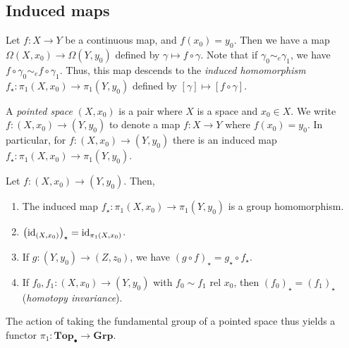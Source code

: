 \subsection{Induced maps}
\begin{definition}
	Let \( f \colon X \to Y \) be a continuous map, and \( f(x_0) = y_0 \).
	Then we have a map \( \Omega(X,x_0) \to \Omega(Y,y_0) \) defined by \( \gamma \mapsto f \circ \gamma \).
	Note that if \( \gamma_0 \sim_e \gamma_1 \), we have \( f \circ \gamma_0 \sim_e f \circ \gamma_1 \).
	Thus, this map descends to the \emph{induced homomorphism} \( f_\star \colon \pi_1(X, x_0) \to \pi_1(Y,y_0) \) defined by \( [\gamma] \mapsto [f \circ \gamma] \).
\end{definition}
\begin{definition}
	A \emph{pointed space} \( (X, x_0) \) is a pair where \( X \) is a space and \( x_0 \in X \).
	We write \( f \colon (X, x_0) \to (Y, y_0) \) to denote a map \( f \colon X \to Y \) where \( f(x_0) = y_0 \).
	In particular, for \( f \colon (X,x_0) \to (Y,y_0) \) there is an induced map \( f_\star \colon \pi_1(X,x_0) \to \pi_1(Y,y_0) \).
\end{definition}
\begin{proposition}
	Let \( f \colon (X, x_0) \to (Y, y_0) \).
	Then,
	\begin{enumerate}
		\item The induced map \( f_\star \colon \pi_1(X, x_0) \to \pi_1(Y, y_0) \) is a group homomorphism.
		\item \( \qty(\mathrm{id}_{(X, x_0)})_\star = \mathrm{id}_{\pi_1(X,x_0)} \).
		\item If \( g \colon (Y, y_0) \to (Z, z_0) \), we have \( (g \circ f)_\star = g_\star \circ f_\star \).
		\item If \( f_0, f_1 \colon (X, x_0) \to (Y, y_0) \) with \( f_0 \sim f_1 \text{ rel } x_0 \), then \( (f_0)_\star = (f_1)_\star \) (\emph{homotopy invariance}).
	\end{enumerate}
\end{proposition}
\begin{remark}
	The action of taking the fundamental group of a pointed space thus yields a functor \( \pi_1 \colon \mathbf{Top}_\bullet \to \mathbf{Grp} \).
\end{remark}
